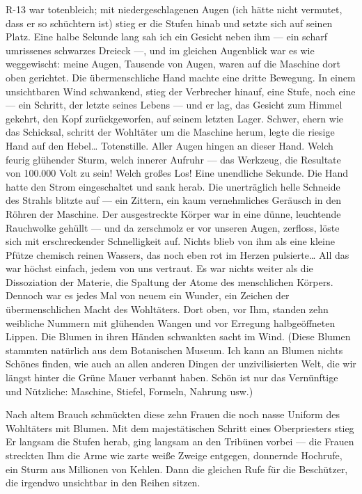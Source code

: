 R-13 war totenbleich; mit niedergeschlagenen Augen (ich hätte nicht
vermutet, dass er so schüchtern ist) stieg er die Stufen hinab und
setzte sich auf seinen Platz. Eine halbe Sekunde lang sah ich ein
Gesicht neben ihm — ein scharf umrissenes schwarzes Dreieck —, und
im gleichen Augenblick war es wie weggewischt: meine Augen,
Tausende von Augen, waren auf die Maschine dort oben gerichtet. Die
übermenschliche Hand machte eine dritte Bewegung. In einem
unsichtbaren Wind schwankend, stieg der Verbrecher hinauf, eine
Stufe, noch eine — ein Schritt, der letzte seines Lebens — und er
lag, das Gesicht zum Himmel gekehrt, den Kopf zurückgeworfen, auf
seinem letzten Lager. Schwer, ehern wie das Schicksal, schritt der
Wohltäter um die Maschine herum, legte die riesige Hand auf den
Hebel\ldots{} Totenstille. Aller Augen hingen an dieser Hand. Welch
feurig glühender Sturm, welch
innerer Aufruhr — das Werkzeug, die Resultate von 100.000 Volt zu
sein! Welch großes Los! Eine unendliche Sekunde. Die Hand hatte den
Strom eingeschaltet und sank herab. Die unerträglich helle Schneide
des Strahls blitzte auf — ein Zittern, ein kaum vernehmliches
Geräusch in den Röhren der Maschine. Der ausgestreckte Körper war
in eine dünne, leuchtende Rauchwolke gehüllt — und da zerschmolz er
vor unseren Augen, zerfloss, löste sich mit erschreckender
Schnelligkeit auf. Nichts blieb von ihm als eine kleine Pfütze
chemisch reinen Wassers, das noch eben rot im Herzen pulsierte\ldots{}
All das war höchst einfach, jedem von uns vertraut. Es war nichts
weiter als die Dissoziation der Materie, die Spaltung der Atome des
menschlichen Körpers. Dennoch war es jedes Mal von neuem ein
Wunder, ein Zeichen der übermenschlichen Macht des Wohltäters. Dort
oben, vor Ihm, standen zehn weibliche Nummern mit glühenden Wangen
und vor Erregung halbgeöffneten Lippen. Die Blumen in ihren Händen
schwankten sacht im Wind. (Diese Blumen stammten natürlich aus dem
Botanischen Museum. Ich kann an Blumen nichts Schönes finden, wie
auch an allen anderen Dingen der unzivilisierten Welt, die wir
längst hinter die Grüne Mauer verbannt haben. Schön ist nur das
Vernünftige und Nützliche: Maschine, Stiefel, Formeln, Nahrung
usw.)

Nach altem Brauch schmückten diese zehn Frauen die noch nasse
Uniform des Wohltäters mit Blumen. Mit dem majestätischen Schritt
eines Oberpriesters stieg Er langsam die Stufen herab, ging langsam
an den Tribünen vorbei — die Frauen streckten Ihm die Arme wie
zarte weiße Zweige entgegen, donnernde Hochrufe, ein Sturm aus
Millionen von Kehlen. Dann die gleichen Rufe für die Beschützer,
die irgendwo unsichtbar in den Reihen sitzen.

